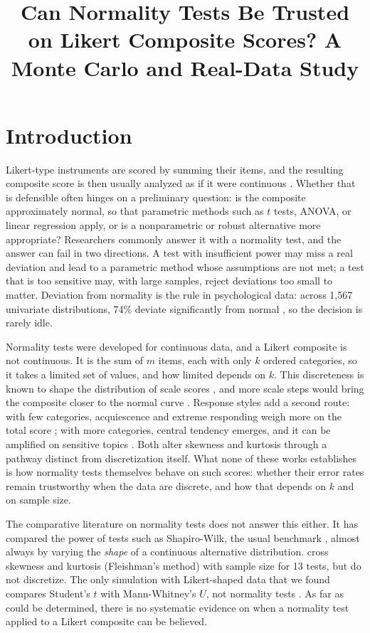 \documentclass[man,mask,donotrepeattitle,floatsintext]{apa7}
\title{Can Normality Tests Be Trusted on Likert Composite Scores? A Monte Carlo and Real-Data Study}
\begin{document}
\maketitle

\section{Introduction}
\label{sec:introduction}

Likert-type instruments are scored by summing their items, and the resulting composite score is then usually analyzed as if it were continuous \parencite{viljoen2015}. Whether that is defensible often hinges on a preliminary question: is the composite approximately normal, so that parametric methods such as $t$ tests, ANOVA, or linear regression apply, or is a nonparametric or robust alternative more appropriate? Researchers commonly answer it with a normality test, and the answer can fail in two directions. A test with insufficient power may miss a real deviation and lead to a parametric method whose assumptions are not met; a test that is too sensitive may, with large samples, reject deviations too small to matter. Deviation from normality is the rule in psychological data: across 1,567 univariate distributions, 74\% deviate significantly from normal \parencite{cain2017}, so the decision is rarely idle.

Normality tests were developed for continuous data, and a Likert composite is not continuous. It is the sum of $m$ items, each with only $k$ ordered categories, so it takes a limited set of values, and how limited depends on $k$. This discreteness is known to shape the distribution of scale scores \parencite{ho2015,sathyanarayana2026}, and more scale steps would bring the composite closer to the normal curve \parencite{viljoen2015}. Response styles add a second route: with few categories, acquiescence and extreme responding weigh more on the total score \parencite{weijters2010}; with more categories, central tendency emerges, and it can be amplified on sensitive topics \parencite[, para.~6]{kurtulus2026}. Both alter skewness and kurtosis through a pathway distinct from discretization itself. What none of these works establishes is how normality tests themselves behave on such scores: whether their error rates remain trustworthy when the data are discrete, and how that depends on $k$ and on sample size.

The comparative literature on normality tests does not answer this either. It has compared the power of tests such as Shapiro-Wilk, the usual benchmark \parencite{razali2011,shapirowilk1965,yap2011}, almost always by varying the \emph{shape} of a continuous alternative distribution. \textcite{kamath2025} cross skewness and kurtosis (Fleishman's method) with sample size for 13 tests, but do not discretize. The only simulation with Likert-shaped data that we found compares Student's $t$ with Mann-Whitney's $U$, not normality tests \parencite{matamoros2026}. As far as could be determined, there is no systematic evidence on when a normality test applied to a Likert composite can be believed.
\end{document}
